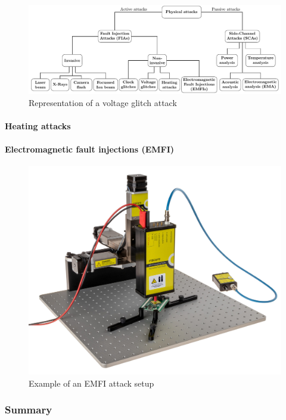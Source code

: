 \begin{figure}[ht]
    \centering
    \includegraphics[page=6, scale=1.25]{c2_soa/img/physicalAttacks.pdf}
    \caption{Representation of a voltage glitch attack}
    \label{fig:voltage_glitch}
\end{figure}


\paragraph{Heating attacks}

\paragraph{Electromagnetic fault injections (EMFI)}

\begin{figure}[ht]
    \centering
    \includegraphics[width=.5\textwidth]{c2_soa/img/emfi_riscure_setup.jpg}
    \caption{Example of an EMFI attack setup}
    \label{fig:emfi_setup}
\end{figure}

\subsubsection{Summary}

